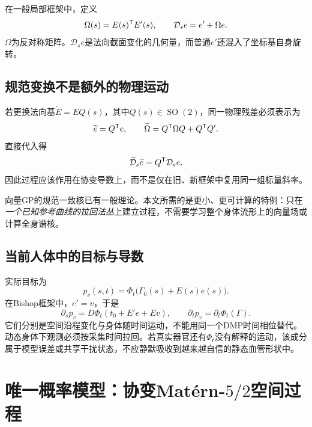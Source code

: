 \documentclass[UTF8,11pt,a4paper,fontset=fandol]{ctexart}
\numberwithin{equation}{section}
\theoremstyle{plain}
\theoremstyle{definition}
\theoremstyle{remark}
\newcommand{\SO}{\operatorname{SO}}\newcommand{\SE}{\operatorname{SE}}
\begin{document}
在一般局部框架中，定义
\begin{equation}
 \Omega(s)=E(s)^{\mathsf T} E'(s),\qquad
 \mathcal D_s e=e'+\Omega e.
 \label{eq:normal-connection}
\end{equation}
$\Omega$为反对称矩阵。$\mathcal D_s e$是法向截面变化的几何量，而普通$e'$还混入了坐标基自身旋转。

\subsection{规范变换不是额外的物理运动}
若更换法向基$\widetilde E=E Q(s)$，其中$Q(s)\in\SO(2)$，同一物理残差必须表示为
\begin{equation}
 \widetilde e=Q^{\mathsf T} e,\qquad
 \widetilde\Omega=Q^{\mathsf T}\Omega Q+Q^{\mathsf T} Q'.
 \label{eq:gauge-connection}
\end{equation}
直接代入得
\begin{equation}
 \widetilde{\mathcal D}_s\widetilde e
 =Q^{\mathsf T}\mathcal D_s e.
 \label{eq:gauge-derivative}
\end{equation}
因此过程应该作用在协变导数上，而不是仅在旧、新框架中复用同一组标量斜率。

向量GP的规范一致核已有一般理论\cite{Hutchinson2021}。本文所需的是更小、更可计算的特例：只在\emph{一个已知参考曲线的拉回法丛}上建立过程，不需要学习整个身体流形上的向量场或计算全身谱核。

\subsection{当前人体中的目标与导数}
实际目标为
\begin{equation}
 p_v(s,t)=\Phi_t\bigl(\Gamma_0(s)+E(s)e(s)\bigr).
 \label{eq:physical-target}
\end{equation}
在Bishop框架中，$e'=v$，于是
\begin{equation}
 \partial_s p_v
 =D\Phi_t\left(t_0+E'e+Ev\right),\qquad
 \partial_t p_v=\partial_t\Phi_t(\Gamma).
 \label{eq:target-derivatives}
\end{equation}
它们分别是空间沿程变化与身体随时间运动，不能用同一个DMP时间相位替代。动态身体下观测必须按采集时间拉回。若真实器官还有$\Phi_t$没有解释的运动，该成分属于模型误差或共享干扰状态，不应静默吸收到越来越自信的静态血管形状中。

\section{唯一概率模型：协变Mat\'ern-$5/2$空间过程}\label{sec:process}
\end{document}
